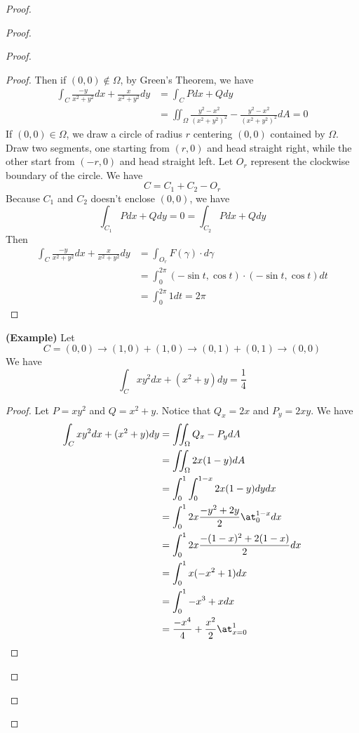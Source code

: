 \documentclass{report}
\begin{document}
\begin{proof}
\begin{proof}
\begin{proof}
\begin{proof}
Then if $(0,0)\not\in \Omega$, by Green's Theorem, we have
\begin{align*}
\int_C \frac{-y}{x^2+y^2}dx+\frac{x}{x^2+y^2}dy&=\int_C Pdx+Qdy\\
&=\iint_{\Omega} \frac{y^2-x^2}{(x^2+y^2)^2}-\frac{y^2-x^2}{(x^2+y^2)^2} dA=0
\end{align*}
If $(0,0)\in \Omega$, we  draw a circle of radius $r$ centering $(0,0)$ contained by $\Omega$. Draw two segments, one starting from $(r,0)$ and head straight right, while the other start from $(-r,0)$ and head straight left. Let  $O_r$ represent the clockwise boundary of the circle. We have
 \begin{equation*}
C=C_1+C_2-O_r
\end{equation*}
Because $C_1$ and  $C_2$ doesn't enclose  $(0,0)$, we have
\begin{equation*}
\int_{C_1} Pdx+Qdy=0=\int_{C_2}Pdx+Qdy
\end{equation*}
Then
\begin{align*}
\int_C \frac{-y}{x^2+y^2}dx+\frac{x}{x^2+y^2}dy&=\int_{O_r} F(\gamma )\cdot d\gamma\\
&=\int_0^{2\pi} (-\sin t,\cos t)\cdot (-\sin t,\cos t)dt\\
&=\int_0^{2\pi} 1dt=2\pi
\end{align*}
\end{proof}
\begin{theorem}
\label{7.3.12}
\textbf{(Example)} Let
\begin{equation*}
C=(0,0)\to (1,0)+(1,0)\to (0,1)+(0,1)\to (0,0)
\end{equation*}
We have
\begin{equation*}
\int_{C}xy^2dx+(x^2+y)dy=\frac{1}{4}
\end{equation*}
\end{theorem}
\begin{proof}
Let $P=xy^2$ and $Q=x^2+y$. Notice that $Q_x=2x$ and  $P_y=2xy$. We have
\begin{align*}
\int_C xy^2dx+(x^2+y)dy&=\iint_{\Omega} Q_x-P_ydA\\
&=\iint_\Omega 2x(1-y)dA\\
&=\int_0^1\int_0^{1-x} 2x(1-y)dydx\\
&=\int_0^12x \frac{-y^2+2y}{2}\at_{0}^{1-x}dx\\
&=\int_0^1 2x \frac{-(1-x)^2+2(1-x)}{2}dx\\
&=\int_0^1 x(-x^2+1)dx\\
&=\int_0^1 -x^3+xdx\\
&=\frac{-x^4}{4}+\frac{x^2}{2}\at_{x=0}^1\\

\end{align*}
\end{proof}
\end{proof}
\end{proof}
\end{proof}
\end{document}
